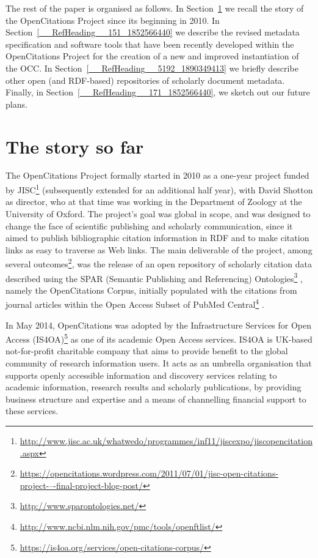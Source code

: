 \documentclass[runningheads,a4paper]{llncs}
\begin{document}
The rest of the paper is organised as follows. In Section~\ref{__RefHeading__5190_1890349413} we recall the story of the OpenCitations Project since its beginning in 2010. In Section~\ref{__RefHeading__151_1852566440} we describe the revised metadata specification and software tools that have been recently developed within the OpenCitations Project for the creation of a new and improved instantiation of the OCC. In Section~\ref{__RefHeading__5192_1890349413} we briefly describe other open (and RDF-based) repositories of scholarly document metadata. Finally, in Section~\ref{__RefHeading__171_1852566440}, we sketch out our future plans.

\section{The story so far}\label{__RefHeading__5190_1890349413}

The OpenCitations Project formally started in 2010 as a one-year project funded by JISC\footnote{\url{http://www.jisc.ac.uk/whatwedo/programmes/inf11/jiscexpo/jiscopencitation.aspx}} (subsequently extended for an additional half year), with David Shotton as director, who at that time was working in the Department of Zoology at the University of Oxford. The project's goal was global in scope, and was designed to change the face of scientific publishing and scholarly communication, since it aimed to publish bibliographic citation information in RDF and to make citation links as easy to traverse as Web links. The main deliverable of the project, among several outcomes\footnote{\url{https://opencitations.wordpress.com/2011/07/01/jisc-open-citations-project-–-final-project-blog-post/}}, was the release of an open repository of scholarly citation data described using the SPAR (Semantic Publishing and Referencing) Ontologies\footnote{\url{http://www.sparontologies.net/}} \cite{__RefNumPara__17_1852566440}, namely the OpenCitations Corpus, initially populated with the citations from journal articles within the Open Access Subset of PubMed Central\footnote{\url{http://www.ncbi.nlm.nih.gov/pmc/tools/openftlist/}} \cite{__RefNumPara__6041_1890349413}.

In May 2014, OpenCitations was adopted by the Infrastructure Services for Open Access (IS4OA)\footnote{\url{https://is4oa.org/services/open-citations-corpus/}} as one of its academic Open Access services. IS4OA is UK-based not-for-profit charitable company that aims to provide benefit to the global community of research information users. It acts as an umbrella organisation that supports openly accessible information and discovery services relating to academic information, research results and scholarly publications, by providing business structure and expertise and a means of channelling financial support to these services.
\end{document}
